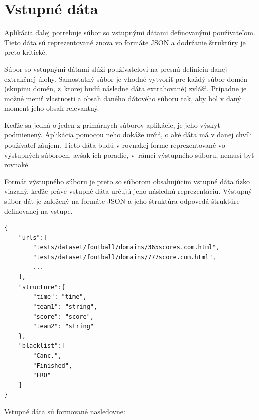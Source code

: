 \section{Vstupné dáta}

Aplikácia ďalej potrebuje súbor so vstupnými dátami definovanými používateľom. Tieto dáta sú reprezentované znova vo formáte JSON a dodržanie štruktúry je preto kritické. 

Súbor so vstupnými dátami slúži používateľovi na presnú definíciu danej extrakčnej úlohy. Samostatný súbor je vhodné vytvoriť pre každý súbor domén (skupinu domén, z~ktorej budú následne dáta extrahované) zvlášť. Prípadne je možné meniť vlastnosti a obsah daného dátového súboru tak, aby bol v daný moment jeho obsah relevantný. 

Keďže sa jedná o jeden z primárnych súborov aplikácie, je jeho výskyt podmienený. Aplikácia pomocou neho dokáže určiť, o aké dáta má v danej chvíli používateľ záujem. Tieto dáta budú v rovnakej forme reprezentované vo výstupných súboroch, avšak ich poradie, v~rámci výstupného súboru, nemusí byť rovnaké.

Formát výstupného súboru je preto so súborom obsahujúcim vstupné dáta úzko viazaný, keďže práve vstupné dáta určujú jeho následnú reprezentáciu. Výstupný súbor dát je založený na formáte JSON a jeho štruktúra odpovedá štruktúre definovanej na vstupe.

\bigskip

\begin{lstlisting}[caption={Príklad súboru so vstupnými dátami. V tomto prípade sú uvedené relatívne cesty použité v rámci testovania datasetu.},captionpos=b,label={data_ex}]
{
    "urls":[
        "tests/dataset/football/domains/365scores.com.html",
        "tests/dataset/football/domains/777score.com.html",
        ...
    ],
    "structure":{
        "time": "time",
        "team1": "string",
        "score": "score",
        "team2": "string"
    },
    "blacklist":[
        "Canc.",
        "Finished",
        "FRO"
    ]
}
\end{lstlisting}

\bigskip

Vstupné dáta sú formované nasledovne:

